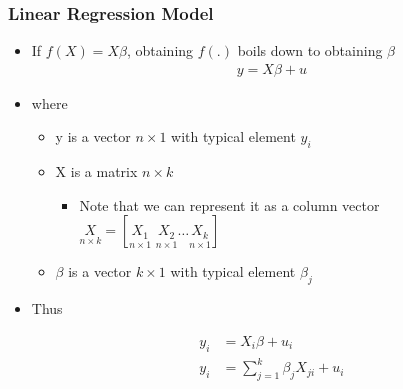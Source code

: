 \documentclass[
  shownotes,
  xcolor={svgnames},
  hyperref={colorlinks,citecolor=DarkBlue,linkcolor=DarkRed,urlcolor=DarkBlue}
  , aspectratio=169]{beamer}
\begin{document}
\begin{frame}
\frametitle{Linear Regression Model}
\bigskip

\begin{itemize}
\item  If $f(X)=X\beta$, obtaining $f(.)$ boils down to obtaining $\beta$
\begin{align}
y = X \beta +u
\end{align}

\item where 
\begin{itemize}
  \item y is a vector $n \times 1$ with typical element $y_i$
  \item X is a matrix $n \times k$ 
  \begin{itemize}
    \tiny
      \item Note that we can represent it as a column vector $\underset{n\times k}{X}=[\underset{n\times 1}{X_1}\,\,\underset{n\times 1}{X_2}\dots \underset{n\times 1}{X_k}] $
  \end{itemize}
  \item $\beta$ is a vector $k \times 1$ with typical element $\beta_j$
\end{itemize}

\bigskip
\item Thus 

\begin{align}
y_i &= X_i \beta +u_i  \\ \nonumber
y_i &= \sum_{j=1}^k \beta_j X_{ji} +u_i
\end{align}
\end{itemize}
\end{frame}
\end{document}
